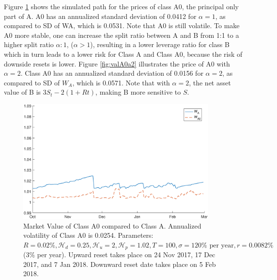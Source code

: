 \documentclass[draft, noinfoline]{ectaart}
\numberwithin{equation}{section}
\theoremstyle{plain}
\begin{document}
\begin{appendices}
Figure \ref{fig:valA0a1} shows the simulated path for the prices of class A0, the principal only part of A. A0 has an annualized standard deviation of 0.0412 for $\alpha=1$, as compared to SD of WA, which is 0.0531. Note that A0 is still volatile. To make A0 more stable, one can increase the split ratio between A and B from 1:1 to a higher split ratio $\alpha:1$, ($\alpha >1$), resulting in a lower leverage ratio for class B which in turn leads to a lower risk for Class A and Class A0, because the risk of downside resets is lower. Figure \ref{fig:valA0a2} illustrates the price of A0 with $\alpha=2$. Class A0 has an annualized standard deviation of 0.0156 for $\alpha=2$, as compared to SD of $W_A$, which is 0.0571. Note that with $\alpha = 2$, the net asset value of B is $3S_t-2(1+Rt)$, making B more sensitive to $S$.


\begin{figure}[!htb]
\centering
\includegraphics[width=0.9\textwidth]{WA0_alpha1.eps}
\caption{Market Value of Class A0 compared to Class A. Annualized volatility of Class A0 is 0.0254. Parameters: $R=0.02\%,\mathcal{H}_{d}=0.25,\mathcal{H}_{u} =2,\mathcal{H}_{p}=1.02,T=100,\sigma= 120 \% \text{ per year}, r=0.0082\%$ (3\% per year). Upward reset takes place on 24 Nov 2017, 17 Dec 2017, and 7 Jan 2018. Downward reset date takes place on 5 Feb 2018.}
\label{fig:valA0a1}
\end{figure}



\end{appendices}
\end{document}
